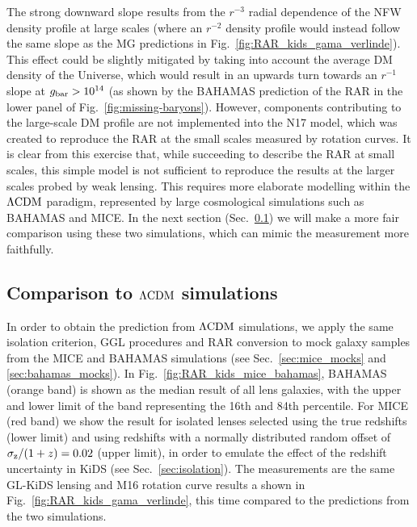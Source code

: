 \documentclass[usenatbib]{mnras}
\newcommand{\lcdm}{{\rm \Lambda CDM}}
\newcommand{\un}[1]{_{\rm #1}}
\begin{document}
The strong downward slope results from the $r^{-3}$ radial dependence of the NFW density profile at large scales (where an $r^{-2}$ density profile would instead follow the same slope as the MG predictions in Fig.~\ref{fig:RAR_kids_gama_verlinde}). This effect could be slightly mitigated by taking into account the average DM density of the Universe, which would result in an upwards turn towards an $r^{-1}$ slope at $g\un{bar}>10^{14}$ (as shown by the BAHAMAS prediction of the RAR in the lower panel of Fig.~\ref{fig:missing-baryons}). However, components contributing to the large-scale DM profile are not implemented into the N17 model, which was created to reproduce the RAR at the small scales measured by rotation curves. It is clear from this exercise that, while succeeding to describe the RAR at small scales, this simple model is not sufficient to reproduce the results at the larger scales probed by weak lensing. This requires more elaborate modelling within the $\lcdm$ paradigm, represented by large cosmological simulations such as BAHAMAS and MICE. In the next section (Sec.~\ref{sec:results-simulations}) we will make a more fair comparison using these two simulations, which can mimic the measurement more faithfully.


\subsection{Comparison to $\lcdm$ simulations}
\label{sec:results-simulations}

In order to obtain the prediction from $\lcdm$ simulations, we apply the same isolation criterion, GGL procedures and RAR conversion to mock galaxy samples from the MICE and BAHAMAS simulations (see Sec.~\ref{sec:mice_mocks} and \ref{sec:bahamas_mocks}). In Fig.~\ref{fig:RAR_kids_mice_bahamas}, BAHAMAS (orange band) is shown as the median result of all lens galaxies, with the upper and lower limit of the band representing the 16th and 84th percentile. For MICE (red band) we show the result for isolated lenses selected using the true redshifts (lower limit) and using redshifts with a normally distributed random offset of $\sigma\un{z}/(1+z) = 0.02$ (upper limit), in order to emulate the effect of the redshift uncertainty in KiDS (see Sec.~\ref{sec:isolation}). The measurements are the same GL-KiDS lensing and M16 rotation curve results a shown in Fig.~\ref{fig:RAR_kids_gama_verlinde}, this time compared to the predictions from the two simulations.
\end{document}
